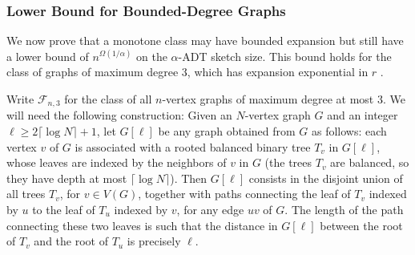 \documentclass[11pt]{article}
\theoremstyle{definition}
\renewcommand{\ge}{\geqslant}
\def\F {{\mathcal F}}
\begin{document}
\subsubsection{Lower Bound for Bounded-Degree Graphs}

We now prove that a monotone class may have bounded expansion but still have a lower bound of
$n^{\Omega(1/\alpha)}$ on the $\alpha$-ADT sketch size. This bound
holds for the class of graphs of maximum
degree 3, which has expansion exponential in $r$ \cite{NO12}.

Write $\F_{n,3}$ for the class of all $n$-vertex graphs of maximum degree at most 3. We will need
the following construction: Given an $N$-vertex graph $G$ and an
integer $\ell\ge 2\lceil \log N\rceil+1$, let
$G[\ell]$ be any graph obtained from $G$ as follows: each vertex $v$ of $G$ is associated with a
rooted balanced binary tree $T_v$ in $G[\ell]$, whose leaves are indexed by the neighbors of $v$ in $G$
(the trees $T_v$ are balanced, so they have depth at most $\lceil \log
N\rceil $). Then $G[\ell]$ consists in the
disjoint union of all trees $T_v$, for $v\in V(G)$, together with paths connecting the leaf of $T_v$
indexed by $u$ to the leaf of $T_u$ indexed by $v$, for any edge $uv$ of $G$. The length of the path
connecting these two leaves is such that the distance in $G[\ell]$ between  the root of $T_v$ and the root
of $T_u$ is precisely $\ell$.
\end{document}
